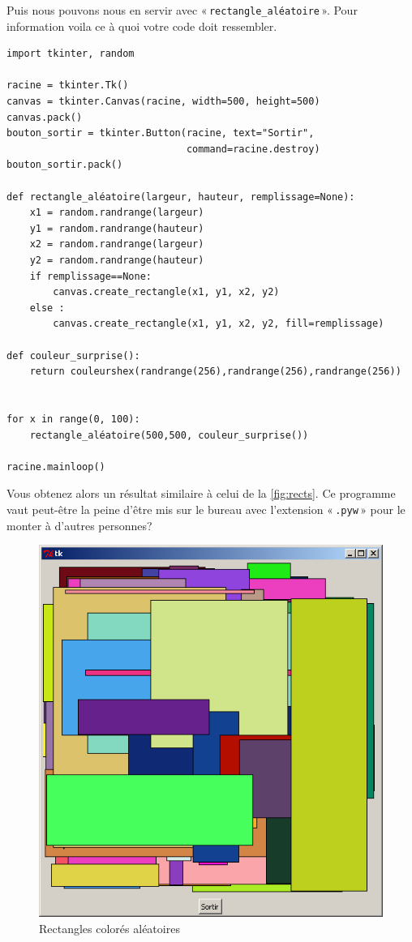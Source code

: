 Puis nous pouvons nous en servir avec « \texttt{rectangle\_aléatoire} ». Pour information voila ce à quoi votre code doit ressembler.

\begin{Verbatim}[frame=single,rulecolor=\color{mbleu}, label=à taper]
import tkinter, random

racine = tkinter.Tk()
canvas = tkinter.Canvas(racine, width=500, height=500)
canvas.pack()
bouton_sortir = tkinter.Button(racine, text="Sortir",
                               command=racine.destroy)
bouton_sortir.pack()

def rectangle_aléatoire(largeur, hauteur, remplissage=None):
    x1 = random.randrange(largeur)
    y1 = random.randrange(hauteur)
    x2 = random.randrange(largeur)
    y2 = random.randrange(hauteur)
    if remplissage==None:
        canvas.create_rectangle(x1, y1, x2, y2)
    else :	
        canvas.create_rectangle(x1, y1, x2, y2, fill=remplissage)

def couleur_surprise():
    return couleurshex(randrange(256),randrange(256),randrange(256))


for x in range(0, 100):
    rectangle_aléatoire(500,500, couleur_surprise())

racine.mainloop()
\end{Verbatim}

Vous obtenez alors un résultat similaire à celui de la \autoref{fig:rects}. Ce programme vaut peut-être la peine d'être mis sur le bureau avec l'extension « \texttt{.pyw} » pour le monter à d'autres personnes?
\begin{figure}[h!]
\centering
\includegraphics[scale=0.4]{images/rectangles2}
\caption{Rectangles colorés aléatoires}\label{fig:rects}
\end{figure}

